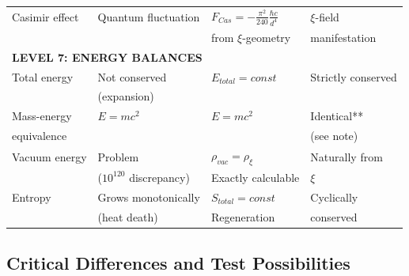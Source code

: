 \begin{table}[htbp]
{\begin{tabular}{p{3.8cm}p{2.5cm}p{3.5cm}p{2.8cm}}
	Casimir effect & Quantum fluctuation & $F_{Cas} = -\frac{\pi^2}{240} \frac{\hbar c}{d^4}$ & $\xi$-field \\
	& & from $\xi$-geometry & manifestation \\[0.3em]
	
	\midrule
	\multicolumn{4}{l}{\textbf{LEVEL 7: ENERGY BALANCES}} \\
	\midrule
	
	Total energy & Not conserved & $E_{total} = const$ & Strictly conserved \\
	& (expansion) & & \\[0.3em]
	
	Mass-energy & $E = mc^2$ & $E = mc^2$ & Identical** \\
	equivalence & & & (see note) \\[0.3em]
	
	Vacuum energy & Problem & $\rho_{vac} = \rho_\xi$ & Naturally from \\
	& ($10^{120}$ discrepancy) & Exactly calculable & $\xi$ \\[0.3em]
	
	Entropy & Grows monotonically & $S_{total} = const$ & Cyclically \\
	& (heat death) & Regeneration & conserved \\[0.3em]
	
\end{tabular}%
}
\end{table}

\normalsize

\subsection{Critical Differences and Test Possibilities}
\label{subsec:critical_differences}

\begin{table}[h]
	\centering
	\caption{Fundamental differences between $\Lambda$CDM and T0}
\end{table}


